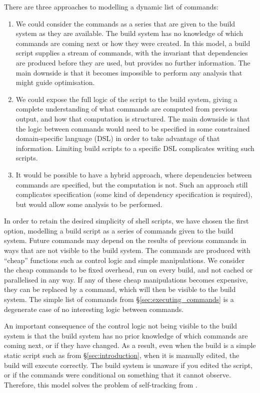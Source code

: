 There are three approaches to modelling a dynamic list of commands:

\begin{enumerate}
\item We could consider the commands as a series that are given to the build system as they are available. The build system has no knowledge of which commands are coming next or how they were created. In this model, a build script supplies a stream of commands, with the invariant that dependencies are produced before they are used, but provides no further information. The main downside is that it becomes impossible to perform any analysis that might guide optimisation.
\item We could expose the full logic of the script to the build system, giving a complete understanding of what commands are computed from previous output, and how that computation is structured. The main downside is that the logic between commands would need to be specified in some constrained domain-specific language (DSL) in order to take advantage of that information. Limiting build scripts to a specific DSL complicates writing such scripts.
\item It would be possible to have a hybrid approach, where dependencies between commands are specified, but the computation is not. Such an approach still complicates specification (some kind of dependency specification is required), but would allow some analysis to be performed.
\end{enumerate}

In order to retain the desired simplicity of shell scripts, we have chosen the first option, modelling a build script as a series of commands given to the build system. Future commands may depend on the results of previous commands in ways that are not visible to the build system. The commands are produced with ``cheap'' functions such as control logic and simple manipulations. We consider the cheap commands to be fixed overhead, run on every build, and not cached or parallelised in any way. If any of these cheap manipulations becomes expensive, they can be replaced by a command, which will then be visible to the build system. The simple list of commands from \S\ref{sec:executing_commands} is a degenerate case of no interesting logic between commands.

An important consequence of the control logic not being visible to the build system is that the build system has no prior knowledge of which commands are coming next, or if they have changed. As a result, even when the build is a simple static script such as from \S\ref{sec:introduction}, when it is manually edited, the build will execute correctly. The build system is unaware if you edited the script, or if the commands were conditional on something that it cannot observe. Therefore, this model solves the problem of self-tracking from \citet[\S6.5]{build_systems_a_la_carte}.

